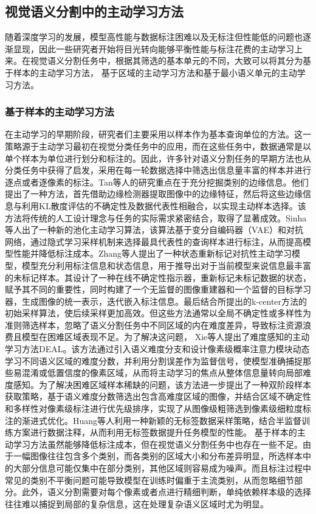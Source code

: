 \subsection{视觉语义分割中的主动学习方法}
随着深度学习的发展，模型高性能与数据标注困难以及无标注但性能低的问题也逐渐显现，因此一些研究者开始将目光转向能够平衡性能与标注花费的主动学习上来。在视觉语义分割任务中，根据其筛选的基本单元的不同，大致可以将其分为基于样本的主动学习方法， 基于区域的主动学习方法和基于最小语义单元的主动学习方法。
\subsubsection{基于样本的主动学习方法}
在主动学习的早期阶段，研究者们主要采用以样本作为基本查询单位的方法。这一策略源于主动学习最初在视觉分类任务中的应用，而在这些任务中，数据通常是以单个样本为单位进行划分和标注的。因此，许多针对语义分割任务的早期方法也从分类任务中获得了启发，采用在每一轮数据选择中筛选出信息量丰富的样本并进行逐点或者逐像素的标注。Tan等人的研究重点在于充分挖掘类别的边缘信息。他们提出了一种方法，首先借助边缘检测器提取图像中的边缘特征，然后将这些边缘信息与利用KL散度评估的不确定性及数据代表性相融合，以实现主动样本选择。该方法将传统的人工设计理念与任务的实际需求紧密结合，取得了显著成效。Sinha等人出了一种新的池化主动学习算法，该算法基于变分自编码器（VAE）和对抗网络，通过隐式学习采样机制来选择最具代表性的查询样本进行标注，从而提高模型性能并降低标注成本。Zhang等人提出了一种状态重新标记对抗性主动学习模型，模型充分利用标注信息和状态信息，用于推导出对于当前模型来说信息最丰富的未标记样本。其设计了一种在线不确定性指示器，重新标记未标记数据的状态，赋予其不同的重要性，同时构建了一个无监督的图像重建器和一个监督的目标学习器，生成图像的统一表示，迭代嵌入标注信息。最后结合所提出的k-center方法的初始采样算法，使后续采样更加高效。但这些方法通常以全局不确定性或多样性为准则筛选样本，忽略了语义分割任务中不同区域的内在难度差异，导致标注资源浪费且模型在困难区域表现不足。为了解决这问题， Xie等人提出了难度感知的主动学习方法DEAL。该方法通过引入语义难度分支和设计像素级概率注意力模块动态学习不同语义区域的难度分数，并利用分割误差作为监督信号，使模型准确捕捉那些易混淆或低置信度的像素区域，从而将主动学习的焦点从整体信息量转向局部难度感知。为了解决困难区域样本稀缺的问题，该方法进一步提出了一种双阶段样本获取策略，基于语义难度分数筛选出包含高难度区域的图像，并结合区域不确定性和多样性对像素级标注进行优先级排序，实现了从图像级粗筛选到像素级细粒度标注的渐进式优化。Huang等人利用一种新颖的无标签数据采样策略，结合半监督训练方案进行数据注释，从而利用无标签数据提升任务模型的性能。
基于样本的主动学习方法虽然能够降低标注成本，但在视觉语义分割任务中也存在一些不足。由于一幅图像往往包含多个类别，而各类别的区域大小和分布差异明显，所选样本中的大部分信息可能仅集中在部分类别，其他区域则容易成为噪声。而且标注过程中常见的类别不平衡问题可能导致模型在训练时偏重于主流类别，从而忽略细节部分。此外，语义分割需要对每个像素或者点进行精细判断，单纯依赖样本级的选择往往难以捕捉到局部的复杂信息，这在处理复杂语义区域时尤为明显。

